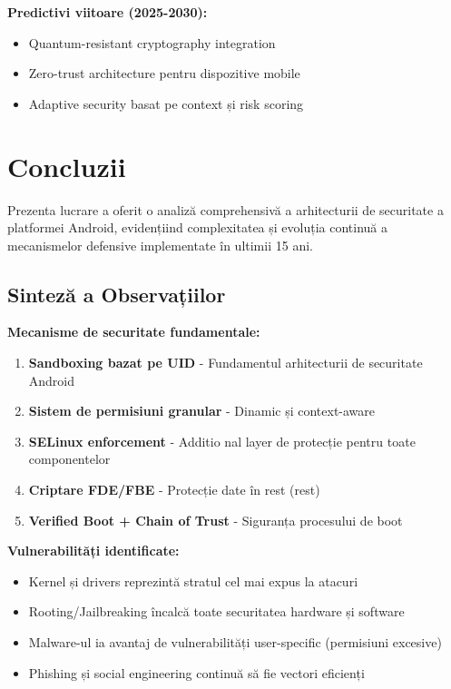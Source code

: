 \documentclass[11pt,a4paper,twocolumn]{article}
\theoremstyle{definition}
\theoremstyle{plain}
\theoremstyle{remark}
\begin{document}
\textbf{Predictivi viitoare (2025-2030):}
\begin{itemize}
    \item Quantum-resistant cryptography integration
    \item Zero-trust architecture pentru dispozitive mobile
    \item Adaptive security basat pe context și risk scoring
\end{itemize}

\section{Concluzii}

Prezenta lucrare a oferit o analiză comprehensivă a arhitecturii de securitate a platformei 
Android, evidențiind complexitatea și evoluția continuă a mecanismelor defensive implementate 
în ultimii 15 ani.

\subsection{Sinteză a Observațiilor}

\textbf{Mecanisme de securitate fundamentale:}
\begin{enumerate}
    \item \textbf{Sandboxing bazat pe UID} - Fundamentul arhitecturii de securitate Android
    \item \textbf{Sistem de permisiuni granular} - Dinamic și context-aware
    \item \textbf{SELinux enforcement} - Additio nal layer de protecție pentru toate componentelor
    \item \textbf{Criptare FDE/FBE} - Protecție date în rest (rest)
    \item \textbf{Verified Boot + Chain of Trust} - Siguranța procesului de boot
\end{enumerate}

\textbf{Vulnerabilități identificate:}
\begin{itemize}
    \item Kernel și drivers reprezintă stratul cel mai expus la atacuri
    \item Rooting/Jailbreaking încalcă toate securitatea hardware și software
    \item Malware-ul ia avantaj de vulnerabilități user-specific (permisiuni excesive)
    \item Phishing și social engineering continuă să fie vectori eficienți
\end{itemize}
\end{document}
